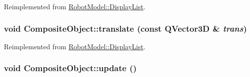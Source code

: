 Reimplemented from \hyperlink{class_robot_model_1_1_display_list_abd15964fcf47dbfdcb06d89517871152}{RobotModel::DisplayList}.\hypertarget{class_robot_model_1_1_composite_object_afd942b7fa3b18bcc01c3fba417a6c027}{
\subsubsection[{translate}]{\setlength{\rightskip}{0pt plus 5cm}void CompositeObject::translate (const QVector3D \& {\em trans})}}
\label{class_robot_model_1_1_composite_object_afd942b7fa3b18bcc01c3fba417a6c027}


Reimplemented from \hyperlink{class_robot_model_1_1_display_list_a6eb574d1f9929d9e2141dbacdeeb1b6a}{RobotModel::DisplayList}.\hypertarget{class_robot_model_1_1_composite_object_aacfefeee128f748e4e705708b9d958e3}{
\subsubsection[{update}]{\setlength{\rightskip}{0pt plus 5cm}void CompositeObject::update ()}}
\label{class_robot_model_1_1_composite_object_aacfefeee128f748e4e705708b9d958e3}


